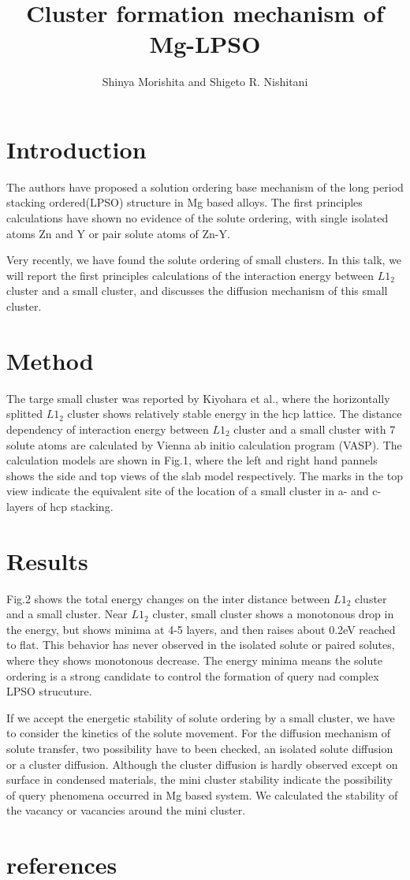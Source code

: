 \documentclass[10pt,a4j]{article}
\begin{document}
\title{Cluster formation mechanism of Mg-LPSO}
\author{Shinya Morishita and Shigeto R. Nishitani}
\date{}
\maketitle
\section{Introduction}
The authors have proposed a solution ordering base mechanism of the long period stacking ordered(LPSO) structure in Mg based alloys.  The first principles calculations have shown no evidence of the solute ordering, with single isolated atoms Zn and Y or pair solute atoms of Zn-Y. 

Very recently, we have found the solute ordering of small clusters.  In this talk, we will report the first principles calculations of the interaction energy between $L1_2$ cluster and a small cluster, and discusses the diffusion mechanism of this small cluster.

\section{Method}
The targe small cluster was reported by Kiyohara et al., where the horizontally splitted $L1_2$ cluster shows relatively stable energy in the hcp lattice.  The distance dependency of interaction energy between $L1_2$ cluster and a small cluster with 7 solute atoms are calculated by Vienna ab initio calculation program (VASP).  The calculation models are shown in Fig.1, where the left and right hand pannels shows the side and top views of the slab model respectively.  The marks in the top view indicate the equivalent site of the location of a small cluster in a- and c- layers of hcp stacking.  

\section{Results}
Fig.2 shows the total energy changes on the inter distance between $L1_2$ cluster and a small cluster.  Near $L1_2$ cluster, small cluster shows a monotonous drop in the energy, but shows minima at 4-5 layers, and then raises about 0.2eV reached to flat.  This behavior has never observed in the isolated solute or paired solutes, where they shows monotonous decrease.  The energy minima means the solute ordering is a strong candidate to control the formation of query nad complex LPSO strucuture.

If we accept the energetic stability of solute ordering by a small cluster, we have to consider the kinetics of the solute movement.  For the diffusion mechanism of solute transfer, two possibility have to been checked, an isolated solute diffusion or a cluster diffusion.  Although the cluster diffusion is hardly observed except on surface in condensed materials, the mini cluster stability indicate the possibility of query phenomena occurred in Mg based system.  We calculated the stability of the vacancy or vacancies around the mini cluster.  

\section{references}
\end{document}

